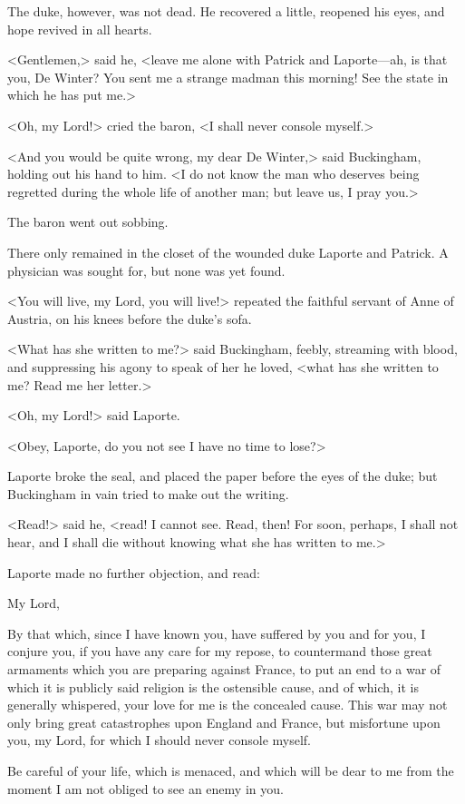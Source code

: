 The duke, however, was not dead. He recovered a little, reopened his eyes, and hope revived in all hearts. 

<Gentlemen,> said he, <leave me alone with Patrick and Laporte—ah, is that you, De Winter? You sent me a strange madman this morning! See the state in which he has put me.> 

<Oh, my Lord!> cried the baron, <I shall never console myself.> 

<And you would be quite wrong, my dear De Winter,> said Buckingham, holding out his hand to him. <I do not know the man who deserves being regretted during the whole life of another man; but leave us, I pray you.> 

The baron went out sobbing. 

There only remained in the closet of the wounded duke Laporte and Patrick. A physician was sought for, but none was yet found. 

<You will live, my Lord, you will live!> repeated the faithful servant of Anne of Austria, on his knees before the duke's sofa. 

<What has she written to me?> said Buckingham, feebly, streaming with blood, and suppressing his agony to speak of her he loved, <what has she written to me? Read me her letter.> 

<Oh, my Lord!> said Laporte. 

<Obey, Laporte, do you not see I have no time to lose?> 

Laporte broke the seal, and placed the paper before the eyes of the duke; but Buckingham in vain tried to make out the writing. 

<Read!> said he, <read! I cannot see. Read, then! For soon, perhaps, I shall not hear, and I shall die without knowing what she has written to me.> 

Laporte made no further objection, and read: 

\begin{mail}{}{My Lord,}
	
By that which, since I have known you, have suffered by you and for you, I conjure you, if you have any care for my repose, to countermand those great armaments which you are preparing against France, to put an end to a war of which it is publicly said religion is the ostensible cause, and of which, it is generally whispered, your love for me is the concealed cause. This war may not only bring great catastrophes upon England and France, but misfortune upon you, my Lord, for which I should never console myself.

Be careful of your life, which is menaced, and which will be dear to me from the moment I am not obliged to see an enemy in you. 

\end{mail}

